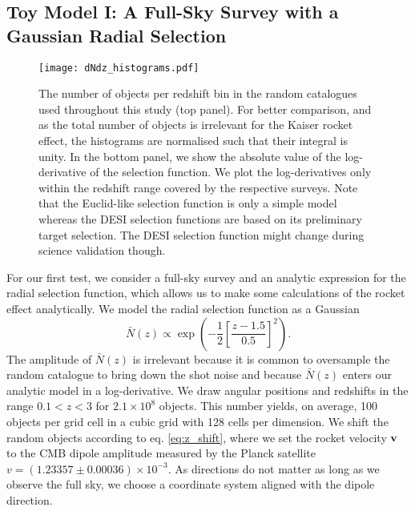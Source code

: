 \documentclass[a4paper,11pt]{article}
\begin{document}
\subsection{Toy Model I: A Full-Sky Survey with a Gaussian Radial Selection}
\label{sec:Gaussian_toy}

\begin{figure}
    \centering
    \texttt{[image: dNdz\_histograms.pdf]}
    \caption{The number of objects per redshift bin in the random catalogues used throughout this study (top panel). For better comparison, and as the total number of objects is irrelevant for the Kaiser rocket effect, the histograms are normalised such that their integral is unity. In the bottom panel, we show the absolute value of the log-derivative of the selection function. We plot the log-derivatives only within the redshift range covered by the respective surveys. Note that the Euclid-like selection function is only a simple model whereas the DESI selection functions are based on its preliminary target selection. The DESI selection function might change during science validation though.}
    \label{fig:dNdz_histograms}
\end{figure}

For our first test, we consider a full-sky survey and an analytic expression for the radial selection function, which allows us to make some calculations of the rocket effect analytically.  We model the radial selection function as a Gaussian
\begin{equation}
    \bar N(z) \propto \exp\left(-\frac{1}{2}\left[\frac{z - 1.5}{0.5}\right]^2\right).
    \label{eq:Gaussian_n_of_z}
\end{equation}
The amplitude of $\bar N (z)$ is irrelevant because it is common to oversample the random catalogue to bring down the shot noise and because $\bar N (z)$ enters our analytic model in a log-derivative. We draw angular positions and redshifts in the range $0.1<z<3$ for $2.1 \times 10^8$ objects. This number yields, on average, 100 objects per grid cell in a cubic grid with 128 cells per dimension. We shift the random objects according to eq. \eqref{eq:z_shift}, where we set  the rocket velocity ${\bf v}$ to the CMB dipole amplitude measured by the Planck satellite \cite{Akrami:2018vks} $v=(1.23357 \pm 0.00036) \times 10^{-3}$. As directions do not matter as long as we observe the full sky, we choose a coordinate system aligned with the dipole direction.
\end{document}

